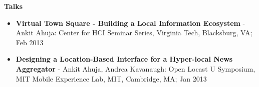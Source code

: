 \documentclass[11pt]{article}
\begin{document}
  \vspace{0.1in}

  \textbf{Talks}

  \begin{itemize}
    \setlength{\parskip}{2mm}%
    \item
      \textbf{Virtual Town Square - Building a Local Information Ecosystem} - Ankit Ahuja: Center for HCI Seminar Series, Virginia Tech, Blacksburg, VA; Feb 2013

    \item
      \textbf{Designing a Location-Based Interface for a Hyper-local News Aggregator} - Ankit Ahuja, Andrea Kavanaugh: Open Locast U Symposium, MIT Mobile Experience Lab, MIT, Cambridge, MA; Jan 2013
  \end{itemize}
\end{document}
